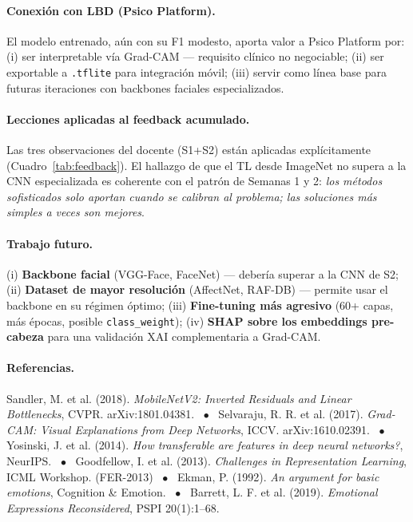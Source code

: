 \documentclass[10pt,a4paper,twocolumn]{article}
\begin{document}
\paragraph{Conexión con LBD (Psico Platform).} El modelo entrenado, aún con su F1 modesto, aporta valor a Psico Platform por: (i) ser interpretable vía Grad-CAM — requisito clínico no negociable; (ii) ser exportable a \texttt{.tflite} para integración móvil; (iii) servir como línea base para futuras iteraciones con backbones faciales especializados.

\paragraph{Lecciones aplicadas al feedback acumulado.} Las tres observaciones del docente (S1+S2) están aplicadas explícitamente (Cuadro~\ref{tab:feedback}). El hallazgo de que el TL desde ImageNet no supera a la CNN especializada es coherente con el patrón de Semanas 1 y 2: \textit{los métodos sofisticados solo aportan cuando se calibran al problema; las soluciones más simples a veces son mejores}.

\paragraph{Trabajo futuro.} (i) \textbf{Backbone facial} (VGG-Face, FaceNet) — debería superar a la CNN de S2; (ii) \textbf{Dataset de mayor resolución} (AffectNet, RAF-DB) — permite usar el backbone en su régimen óptimo; (iii) \textbf{Fine-tuning más agresivo} (60+ capas, más épocas, posible \texttt{class\_weight}); (iv) \textbf{SHAP sobre los embeddings pre-cabeza} para una validación XAI complementaria a Grad-CAM.

\paragraph{Referencias.}
{\footnotesize
Sandler, M. et al. (2018). \textit{MobileNetV2: Inverted Residuals and Linear Bottlenecks}, CVPR. arXiv:1801.04381. ~$\bullet$~
Selvaraju, R. R. et al. (2017). \textit{Grad-CAM: Visual Explanations from Deep Networks}, ICCV. arXiv:1610.02391. ~$\bullet$~
Yosinski, J. et al. (2014). \textit{How transferable are features in deep neural networks?}, NeurIPS. ~$\bullet$~
Goodfellow, I. et al. (2013). \textit{Challenges in Representation Learning}, ICML Workshop. (FER-2013) ~$\bullet$~
Ekman, P. (1992). \textit{An argument for basic emotions}, Cognition \& Emotion. ~$\bullet$~
Barrett, L. F. et al. (2019). \textit{Emotional Expressions Reconsidered}, PSPI 20(1):1--68.
}
\end{document}
